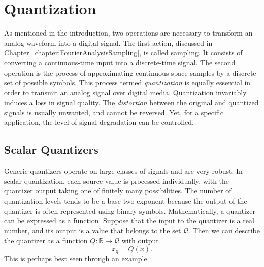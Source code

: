 \chapter{Quantization}

As mentioned in the introduction, two operations are necessary to transform an analog waveform into a digital signal.
The first action, discussed in Chapter~\ref{chapter:FourierAnalysisSampling}, is called sampling.
It consists of converting a continuous-time input into a discrete-time signal.
The second operation is the process of approximating continuous-space samples by a discrete set of possible symbols.
This process termed \emph{quantization} is equally essential in order to transmit an analog signal over digital media.
Quantization invariably induces a loss in signal quality.
The \emph{distortion} between the original and quantized signals is usually unwanted, and cannot be reversed.
Yet, for a specific application, the level of signal degradation can be controlled.


\section{Scalar Quantizers}

Generic quantizers operate on large classes of signals and are very robust.
In scalar quantization, each source value is processed individually, with the quantizer output taking one of finitely many possibilities.
The number of quantization levels tends to be a base-two exponent because the output of the quantizer is often represented using binary symbols.
Mathematically, a quantizer can be expressed as a function.
Suppose that the input to the quantizer is a real number, and its output is a value that belongs to the set $\mathcal{Q}$.
Then we can describe the quantizer as a function $Q : \mathbb{R} \mapsto \mathcal{Q}$ with output
\begin{equation*}
x_{\mathrm{q}} = Q(x) .
\end{equation*}
This is perhaps best seen through an example.



